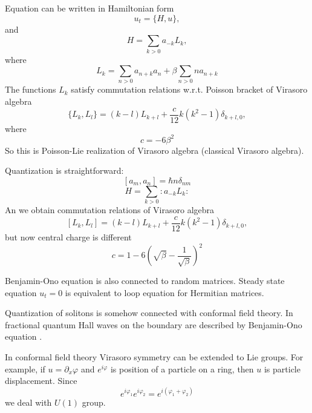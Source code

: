 \documentclass[12pt]{article}
\begin{document}
Equation can be written in Hamiltonian form
\begin{equation}
  \label{eq:22}
  u_{t}=\{H,u\},
\end{equation}
and
\begin{equation}
  \label{eq:23}
  H=\sum_{k>0} a_{-k} L_{k},
\end{equation}
where
\begin{equation}
  \label{eq:24}
  L_{k}=\sum_{n>0} a_{n+k} a_{n}+\beta\sum_{n>0} n a_{n+k}
\end{equation}
The functions $L_{k}$ satisfy commutation relations w.r.t. Poisson bracket of Virasoro algebra
\begin{equation}
  \label{eq:25}
  \{L_{k},L_{l}\}=(k-l)L_{k+l}+\frac{c}{12} k(k^{2}-1) \delta_{k+l,0},
\end{equation}
where
\begin{equation}
  \label{eq:26}
  c=-6\beta^{2}
\end{equation}
So this is Poisson-Lie realization of Virasoro algebra (classical Virasoro algebra). 

Quantization is straightforward:
\begin{equation}
  \label{eq:27}
  [a_{m}, a_{n}]=\hbar n \delta_{nm}
\end{equation}
\begin{equation}
  \label{eq:28}
  H=\sum_{k>0}:a_{-k}L_{k}:
\end{equation}
An we obtain commutation relations of Virasoro algebra
\begin{equation}
  \label{eq:29}
   [L_{k},L_{l}]=(k-l)L_{k+l}+\frac{c}{12} k(k^{2}-1) \delta_{k+l,0},
\end{equation}
but now central charge is different
\begin{equation}
  \label{eq:30}
  c=1-6\left( \sqrt{\beta} -\frac{1}{\sqrt{\beta}}\right)^{2}
\end{equation}

Benjamin-Ono equation is also connected to random matrices. Steady state equation $u_{t}=0$ is
equivalent to loop equation for Hermitian matrices. 

Quantization of solitons is somehow connected with conformal field theory. In fractional quantum
Hall waves on the boundary are described by Benjamin-Ono equation \cite{?Wiegmann}. 

In conformal field theory Virasoro symmetry can be extended to Lie groups. For example, if
$u=\partial_{x} \varphi$ and $e^{i\varphi}$ is position of a particle on a ring, then $u$ is
particle displacement. Since
\begin{equation}
  \label{eq:31}
  e^{i\varphi_{1}}e^{i\varphi_{2}}=e^{i(\varphi_{1}+\varphi_{2})}
\end{equation}
we deal with $U(1)$ group. 
\end{document}

